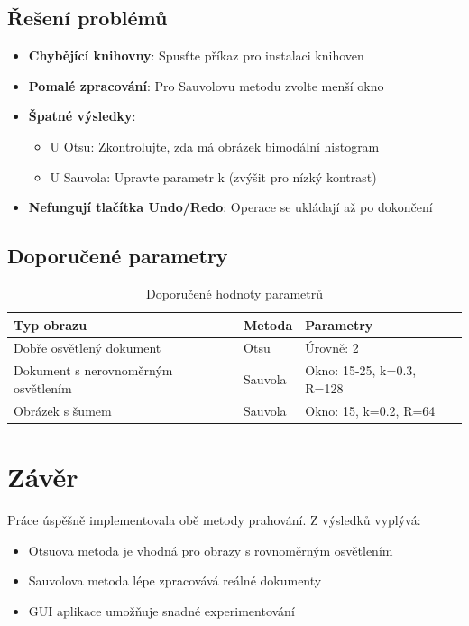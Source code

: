 \documentclass[12pt,a4paper]{article}
\begin{document}
\subsection{Řešení problémů}
\begin{itemize}
\item \textbf{Chybějící knihovny}: Spusťte příkaz pro instalaci knihoven
\item \textbf{Pomalé zpracování}: Pro Sauvolovu metodu zvolte menší okno
\item \textbf{Špatné výsledky}:
\begin{itemize}
\item U Otsu: Zkontrolujte, zda má obrázek bimodální histogram
\item U Sauvola: Upravte parametr k (zvýšit pro nízký kontrast)
\end{itemize}
\item \textbf{Nefungují tlačítka Undo/Redo}: Operace se ukládají až po dokončení
\end{itemize}

\subsection{Doporučené parametry}
\begin{table}[h]
\centering
\caption{Doporučené hodnoty parametrů}
\begin{tabular}{|l|l|l|}
\hline
Typ obrazu & Metoda & Parametry \\
\hline
Dobře osvětlený dokument & Otsu & Úrovně: 2 \\
Dokument s nerovnoměrným osvětlením & Sauvola & Okno: 15-25, k=0.3, R=128 \\
Obrázek s šumem & Sauvola & Okno: 15, k=0.2, R=64 \\
\hline
\end{tabular}
\end{table}

\section{Závěr}
Práce úspěšně implementovala obě metody prahování. Z výsledků vyplývá:
\begin{itemize}
\item Otsuova metoda je vhodná pro obrazy s rovnoměrným osvětlením
\item Sauvolova metoda lépe zpracovává reálné dokumenty
\item GUI aplikace umožňuje snadné experimentování
\end{itemize}
\end{document}
